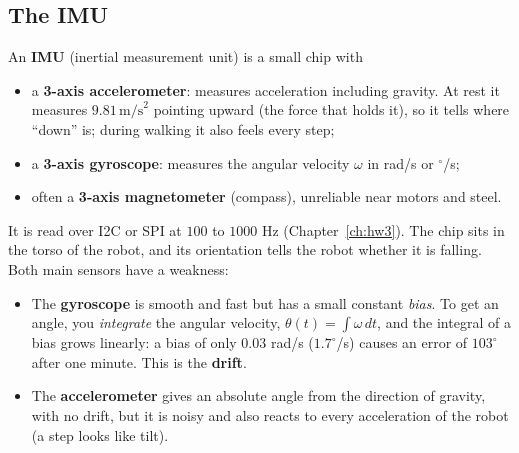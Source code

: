 \subsection*{The IMU}
An \textbf{IMU} (inertial measurement unit) is a small chip with
\begin{itemize}[nosep]
  \item a \textbf{3-axis accelerometer}: measures acceleration including gravity. At rest it measures $9.81\,\text{m/s}^2$ pointing upward (the force that holds it), so it tells where ``down'' is; during walking it also feels every step;
  \item a \textbf{3-axis gyroscope}: measures the angular velocity $\omega$ in rad/s or $^\circ$/s;
  \item often a \textbf{3-axis magnetometer} (compass), unreliable near motors and steel.
\end{itemize}
It is read over I2C or SPI at $100$ to $1000$ Hz (Chapter~\ref{ch:hw3}). The chip sits in the torso of the robot, and its orientation tells the robot whether it is falling. Both main sensors have a weakness:
\begin{itemize}[nosep]
  \item The \textbf{gyroscope} is smooth and fast but has a small constant \emph{bias}. To get an angle, you \emph{integrate} the angular velocity, $\theta(t)=\int\omega\,dt$, and the integral of a bias grows linearly: a bias of only $0.03$ rad/s ($1.7^\circ$/s) causes an error of $103^\circ$ after one minute. This is the \textbf{drift}.
  \item The \textbf{accelerometer} gives an absolute angle from the direction of gravity, with no drift, but it is noisy and also reacts to every acceleration of the robot (a step looks like tilt).
\end{itemize}

